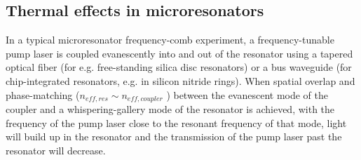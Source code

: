 %






\subsection{Thermal effects in microresonators} \label{sec:thermaleffects}


In a typical microresonator frequency-comb experiment, a frequency-tunable pump laser is coupled evanescently into and out of the resonator using a tapered optical fiber \cite{Knight1997,Spillane2003} (for e.g. free-standing silica disc resonators) or a bus waveguide (for chip-integrated resonators, e.g. in silicon nitride rings). When spatial overlap and phase-matching ($n_{eff,res}\sim n_{eff,coupler}$ \cite{ShahHosseini2010}) between the evanescent mode of the coupler and a whispering-gallery mode of the resonator is achieved, with the frequency of the pump laser close to the resonant frequency of that mode, light will build up in the resonator and the transmission of the pump laser past the resonator will decrease.

